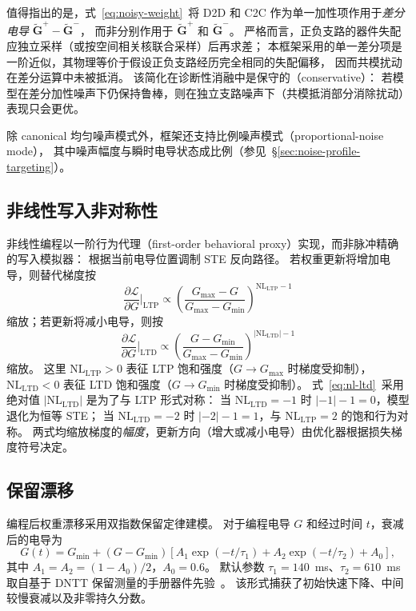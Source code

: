 值得指出的是，式~\ref{eq:noisy-weight}~将 D2D 和 C2C 作为单一加性项作用于\emph{差分电导} $\widetilde{\mathbf{G}}^{+} - \widetilde{\mathbf{G}}^{-}$，
而非分别作用于 $\widetilde{\mathbf{G}}^{+}$ 和 $\widetilde{\mathbf{G}}^{-}$。
严格而言，正负支路的器件失配应独立采样（或按空间相关核联合采样）后再求差；
本框架采用的单一差分项是一阶近似，其物理等价于假设正负支路经历完全相同的失配偏移，
因而共模扰动在差分运算中未被抵消。
该简化在诊断性消融中是保守的（conservative）：
若模型在差分加性噪声下仍保持鲁棒，则在独立支路噪声下（共模抵消部分消除扰动）表现只会更优。

除 canonical 均匀噪声模式外，框架还支持比例噪声模式（proportional-noise mode），
其中噪声幅度与瞬时电导状态成比例（参见~\S\ref{sec:noise-profile-targeting}）。

\subsection{非线性写入非对称性}

非线性编程以一阶行为代理（first-order behavioral proxy）实现，而非脉冲精确的写入模拟器：
根据当前电导位置调制 STE 反向路径。
若权重更新将增加电导，则替代梯度按
\begin{equation}
\frac{\partial \mathcal{L}}{\partial G}\Big|_{\mathrm{LTP}} \propto \left(\frac{G_{\max}-G}{G_{\max}-G_{\min}}\right)^{\mathrm{NL}_{\mathrm{LTP}}-1}
\label{eq:nl-ltp}
\end{equation}
缩放；若更新将减小电导，则按
\begin{equation}
\frac{\partial \mathcal{L}}{\partial G}\Big|_{\mathrm{LTD}} \propto \left(\frac{G-G_{\min}}{G_{\max}-G_{\min}}\right)^{|\mathrm{NL}_{\mathrm{LTD}}|-1}
\label{eq:nl-ltd}
\end{equation}
缩放。
这里 $\mathrm{NL}_{\mathrm{LTP}} > 0$ 表征 LTP 饱和强度（$G \to G_{\max}$ 时梯度受抑制），
$\mathrm{NL}_{\mathrm{LTD}} < 0$ 表征 LTD 饱和强度（$G \to G_{\min}$ 时梯度受抑制）。
式~\ref{eq:nl-ltd}~采用绝对值 $|\mathrm{NL}_{\mathrm{LTD}}|$ 是为了与 LTP 形式对称：
当 $\mathrm{NL}_{\mathrm{LTD}} = -1$ 时 $|-1|-1 = 0$，模型退化为恒等 STE；
当 $\mathrm{NL}_{\mathrm{LTD}} = -2$ 时 $|-2|-1 = 1$，与 $\mathrm{NL}_{\mathrm{LTP}} = 2$ 的饱和行为对称。
两式均缩放梯度的\emph{幅度}，更新方向（增大或减小电导）由优化器根据损失梯度符号决定。

\subsection{保留漂移}

编程后权重漂移采用双指数保留定律建模。
对于编程电导 $G$ 和经过时间 $t$，衰减后的电导为
\begin{equation}
G(t) = G_{\min} + \left(G - G_{\min}\right) \left[A_1 \exp\left(-t/\tau_1\right) + A_2 \exp\left(-t/\tau_2\right) + A_0\right],
\label{eq:retention}
\end{equation}
其中 $A_1 = A_2 = (1-A_0)/2$，$A_0 = 0.6$。
默认参数 $\tau_1 = 140$~ms、$\tau_2 = 610$~ms 取自基于 DNTT 保留测量的手册器件先验~\citep{vincze2025dualplasticity}。
该形式捕获了初始快速下降、中间较慢衰减以及非零持久分数。

